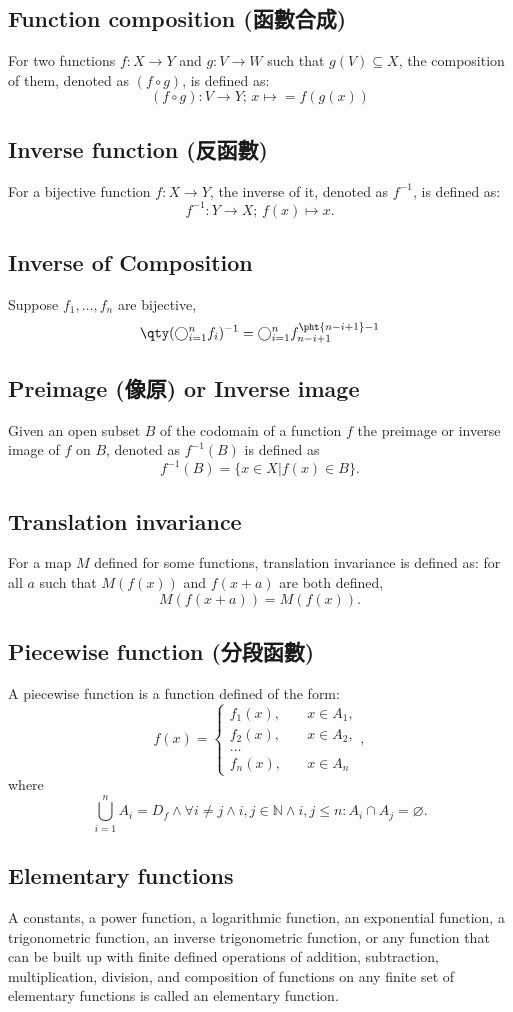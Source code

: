 \documentclass[a4paper,12pt]{report}
\begin{document}
\subsection{Function composition (函數合成)}
For two functions $f\colon X\to Y$ and $g\colon V\to W$ such that $g(V)\subseteq X$, the composition of them, denoted as $(f\circ g)$, is defined as:
\[(f \circ g)\colon V\to Y;\,x\mapsto = f(g(x))\]
\subsection{Inverse function (反函數)}
For a bijective function $f\colon X\to Y$, the inverse of it, denoted as $f^{-1}$, is defined as:
\[f^{-1}\colon Y\to X;\,f(x)\mapsto x.\]
\subsection{Inverse of Composition}
Suppose $f_1,\ldots,f_n$ are bijective,
\[\qty(\bigcirc_{i=1}^nf_i)^{-1}=\bigcirc_{i=1}^nf_{n-i+1}^{\pht{n-i+1}-1}\]
\subsection{Preimage (像原) or Inverse image}
Given an open subset $B$ of the codomain of a function $f$ the preimage or inverse image of $f$ on $B$, denoted as $f^{-1}(B)$ is defined as
\[f^{-1}(B)=\{x\in X|f(x)\in B\}.\]
\subsection{Translation invariance}
For a map $M$ defined for some functions, translation invariance is defined as: for all $a$ such that $M(f(x))$ and $f(x+a)$ are both defined,
\[M(f(x+a))=M(f(x)).\]
\subsection{Piecewise function (分段函數)}
A piecewise function is a function defined of the form:
\[f(x) =
\begin{cases}
f_1(x), & \quad x\in A_1, \\
f_2(x), & \quad x\in A_2, \\
\dots  \\
f_n(x), & \quad x \in A_n
\end{cases},\]
where
\[\bigcup_{i=1}^nA_i=D_f\land\forall i\neq j\land i,j\in\mathbb{N}\land i,j\leq n\colon A_i\cap A_j=\varnothing.\]
\subsection{Elementary functions}
A constants, a power function, a logarithmic function, an exponential function, a trigonometric function, an inverse trigonometric function, or any function that can be built up with finite defined operations of addition, subtraction, multiplication, division, and composition of functions on any finite set of elementary functions is called an elementary function.
\end{document}
